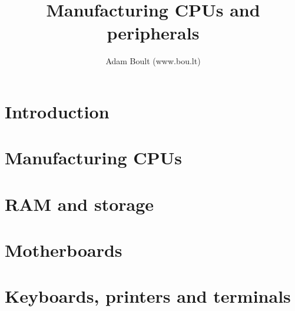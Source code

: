 \documentclass[oneside]{book}
\begin{document}
\author{Adam Boult (www.bou.lt)}
\title{Manufacturing CPUs and peripherals}
\maketitle

\setcounter{tocdepth}{0}
\tableofcontents



\part{Introduction}

\part{Manufacturing CPUs}

\part{RAM and storage}

\part{Motherboards}

\part{Keyboards, printers and terminals}
\end{document}
